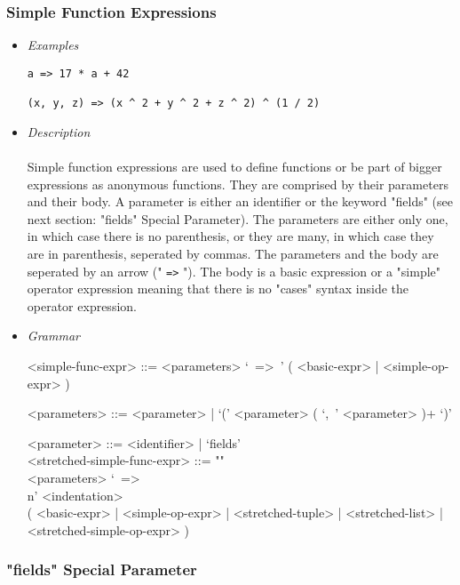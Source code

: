 \documentclass{article}
\begin{document}
\subsubsection{Simple Function Expressions}

\begin{itemize}
\item \textit{Examples}

\begin{verbatim}
a => 17 * a + 42

(x, y, z) => (x ^ 2 + y ^ 2 + z ^ 2) ^ (1 / 2)
\end{verbatim}

\item \textit{Description}\\\\
Simple function expressions are used to define functions or be part of bigger
expressions as anonymous functions. They are comprised by their parameters and
their body. A parameter is either an identifier or the keyword "fields" (see
next section: "fields" Special Parameter). The parameters are either only one,
in which case there is no parenthesis, or they are many, in which case they are
in parenthesis, seperated by commas. The parameters and the body are seperated
by an arrow (" \texttt{=>} "). The body is a basic expression or a "simple"
operator expression meaning that there is no "cases" syntax inside the operator
expression.

\item \textit{Grammar}
\begin{grammar}
<simple-func-expr> ::=
<parameters> `\ =>\ ' ( <basic-expr> | <simple-op-expr> )

<parameters> ::= <parameter> | `(' <parameter> ( `,\ ' <parameter> )+ `)'

<parameter> ::= <identifier> | `fields'\\

<stretched-simple-func-expr> ::= ""\\
<parameters> `\ =>\\n' <indentation> \\
( <basic-expr> | <simple-op-expr> | <stretched-tuple> | <stretched-list> |
<stretched-simple-op-expr> )
\end{grammar}
\end{itemize}

\subsubsection{"fields" Special Parameter}
\end{document}

